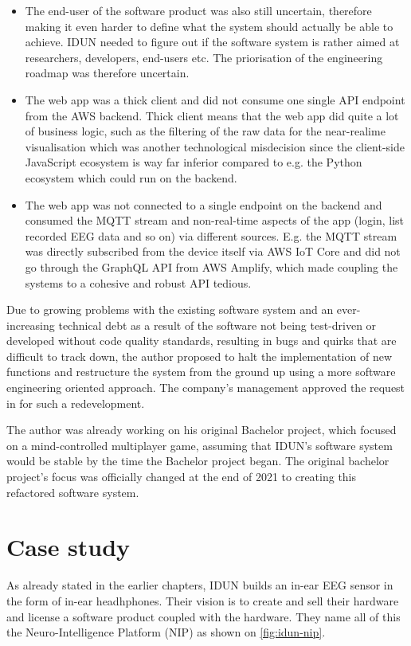 \begin{itemize}
   \item The end-user of the software product was also still uncertain, therefore making it even harder to define what the system should actually be able to achieve. IDUN needed to figure out if the software system is rather aimed at researchers, developers, end-users etc. The priorisation of the engineering roadmap was therefore uncertain.
   \item The web app was a thick client and did not consume one single API endpoint from the AWS backend. Thick client means that the web app did quite a lot of business logic, such as the filtering of the raw data for the near-realime visualisation which was another technological misdecision since the client-side JavaScript ecosystem is way far inferior compared to e.g. the Python ecosystem which could run on the backend.
   \item The web app was not connected to a single endpoint on the backend and consumed the MQTT stream and non-real-time aspects of the app (login, list recorded EEG data and so on) via different sources. E.g. the MQTT stream was directly subscribed from the device itself via AWS IoT Core and did not go through the GraphQL API from AWS Amplify, which made coupling the systems to a cohesive and robust API tedious.
\end{itemize}

Due to growing problems with the existing software system and an ever-increasing technical debt as a result of the software not being test-driven or developed without code quality standards, resulting in bugs and quirks that are difficult to track down, the author proposed to halt the implementation of new functions and restructure the system from the ground up using a more software engineering oriented approach. The company's management approved the request in for such a redevelopment.

The author was already working on his original Bachelor project, which focused on a mind-controlled multiplayer game, assuming that IDUN's software system would be stable by the time the Bachelor project began. The original bachelor project's focus was officially changed at the end of 2021 to creating this refactored software system.

\section{Case study}
\label{chapter3-case-study}

As already stated in the earlier chapters, IDUN builds an in-ear EEG sensor in the form of in-ear headhphones. Their vision is to create and sell their hardware and license a software product coupled with the hardware. They name all of this the Neuro-Intelligence Platform (NIP) as shown on \autoref{fig:idun-nip}.

